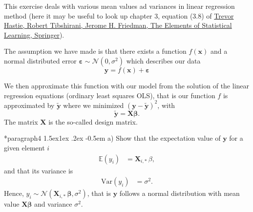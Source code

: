 \documentclass[%
oneside,                 %
final,                   %
10pt]{article}
\makeatletter
\newenvironment{doconceexercise}{}{}
\newcounter{doconceexercisecounter}
\newcommand\subex{\@startsection*{paragraph}{4}{\z@}%
                  {1.5ex\@plus1ex \@minus.2ex}%
                  {-0.5em}%
                  {\normalfont\normalsize\bfseries}}
\makeatother
\begin{document}
\begin{doconceexercise}



This exercise deals with various mean values ad variances in  linear regression method (here it may be useful to look up chapter 3, equation (3.8) of \href{{https://www.springer.com/gp/book/9780387848570}}{Trevor Hastie, Robert Tibshirani, Jerome H. Friedman, The Elements of Statistical Learning, Springer}).

The assumption we have made is 
that there exists a function $f(\bm{x})$ and  a normal distributed error $\bm{\varepsilon}\sim \mathcal{N}(0, \sigma^2)$
which describes our data
\[
\bm{y} = f(\bm{x})+\bm{\varepsilon}
\]

We then approximate this function with our model from the solution of the linear regression equations (ordinary least squares OLS), that is our
function $f$ is approximated by $\bm{\tilde{y}}$ where we minimized  $(\bm{y}-\bm{\tilde{y}})^2$, with
\[
\bm{\tilde{y}} = \bm{X}\bm{\beta}.
\]
The matrix $\bm{X}$ is the so-called design matrix.


\subex{a)}
Show that  the expectation value of $\bm{y}$ for a given element $i$ 
\begin{align*} 
\mathbb{E}(y_i) & =\mathbf{X}_{i, \ast} \, \beta, 
\end{align*} 
and that
its variance is 
\begin{align*} \mbox{Var}(y_i) & = \sigma^2.  
\end{align*}
Hence, $y_i \sim \mathcal{N}( \mathbf{X}_{i, \ast} \, \bm{\beta}, \sigma^2)$, that is $\bm{y}$ follows a normal distribution with 
mean value $\bm{X}\bm{\beta}$ and variance $\sigma^2$.



\end{doconceexercise}
\end{document}
